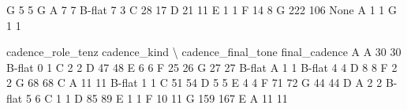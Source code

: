 \documentclass[letterpaper,10pt,english]{sphinxmanual}
\begin{document}
{\begin{sphinxVerbatim}[commandchars=\\\{\}]
                   G                               5              5
G                  A                               7              7
                   B-flat                          7              3
                   C                              28             17
                   D                              21             11
                   E                               1              1
                   F                              14              8
                   G                             222            106
None               A                               1              1
                   G                               1              1

                                  cadence\_role\_tenz  cadence\_kind  \textbackslash{}
cadence\_final\_tone final\_cadence
A                  A                             30            30
                   B-flat                         0             1
                   C                              2             2
                   D                             47            48
                   E                              6             6
                   F                             25            26
                   G                             27            27
B-flat             A                              1             1
                   B-flat                         4             4
                   D                              8             8
                   F                              2             2
                   G                             68            68
C                  A                             11            11
                   B-flat                         1             1
                   C                             51            54
                   D                              5             5
                   E                              4             4
                   F                             71            72
                   G                             44            44
D                  A                              2             2
                   B-flat                         5             6
                   C                              1             1
                   D                             85            89
                   E                              1             1
                   F                             10            11
                   G                            159           167
E                  A                             11            11

\end{sphinxVerbatim}}
\end{document}
